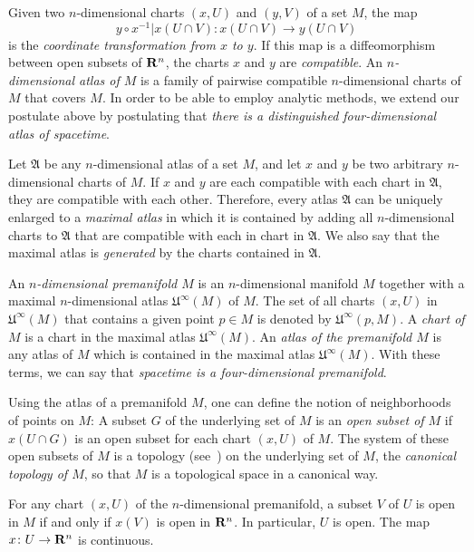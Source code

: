 Given two $n$-dimensional charts $(x, U)$ and $(y, V)$ of a set $M$, the map
\[
  y \circ x^{-1}|x(U \cap V)\colon x(U \cap V) \to y(U \cap V)
\]
is the
\emph{coordinate transformation from $x$ to $y$}. If this map is a diffeomorphism
between open subsets of $\mathbf{R}^n$, the charts $x$ and $y$ are \emph{compatible}.
An \emph{$n$-dimensional atlas of $M$} is a family of pairwise compatible
$n$-dimensional charts of $M$ that covers $M$. In order to be able to employ 
analytic methods, we extend our postulate above by postulating that
\emph{there is a distinguished four-dimensional atlas of spacetime}.

Let $\mathfrak A$ be any $n$-dimensional atlas of a set $M$, and let $x$ and $y$
be two arbitrary $n$-dimensional charts of $M$. If $x$ and $y$ are each compatible
with each chart in $\mathfrak A$, they are compatible with each other. Therefore,
every atlas $\mathfrak A$ can be uniquely enlarged to a \emph{maximal atlas} in
which it is contained by adding all $n$-dimensional charts to $\mathfrak A$ that
are compatible with each in chart in $\mathfrak A$. We also say that the maximal
atlas is \emph{generated} by the charts contained in $\mathfrak A$.

An \emph{$n$-dimensional premanifold $M$} is an $n$-dimensional manifold $M$ together
with a maximal $n$-dimensional atlas $\mathfrak U^\infty(M)$ of $M$. The set of
all charts $(x, U)$ in $\mathfrak U^\infty(M)$ that contains a given point $p \in M$ is 
denoted by $\mathfrak U^\infty(p, M)$. A \emph{chart of $M$} is a chart in the
maximal atlas $\mathfrak U^\infty(M)$.
An \emph{atlas of the premanifold $M$} is any atlas of $M$ which is contained in
the maximal atlas $\mathfrak U^\infty(M)$. With these terms, we can say that
\emph{spacetime is a four-dimensional premanifold}.

Using the atlas of a premanifold $M$, one can define the notion of neighborhoods
of points on $M$: A subset $G$ of the underlying set of $M$ is an \emph{open subset
of $M$} if $x(U \cap G)$ is an open subset for each chart $(x, U)$ of $M$. The
system of these open subsets of $M$ is a topology (see~)
on the underlying set of $M$, the \emph{canonical topology of $M$}, so that $M$
is a topological space in a canonical way.

For any chart $(x, U)$ of the $n$-dimensional premanifold, a subset $V$ of $U$
is open in $M$ if and only if $x(V)$ is open in $\mathbf{R}^n$. In particular, $U$ is open.
The map $x\colon U \to \mathbf{R}^n$ is continuous.

